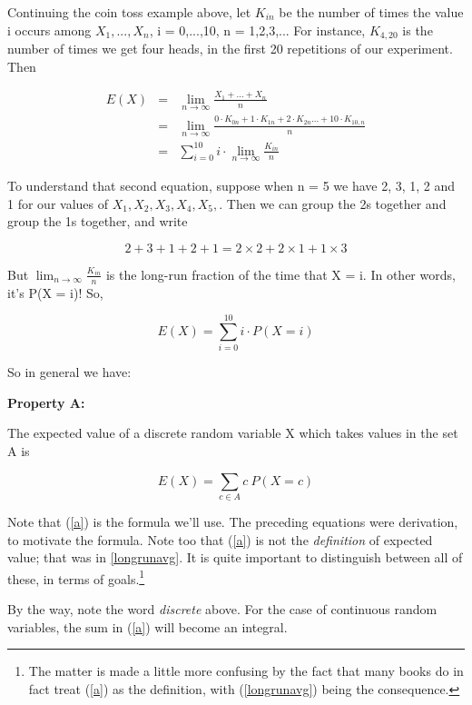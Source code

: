 Continuing the coin toss example above, let $K_{in}$ be the number of
times the value i occurs among $X_1,...,X_n$, i = 0,...,10, n =
1,2,3,...  For instance, $K_{4,20}$ is the number of times we get four
heads, in the first 20 repetitions of our experiment.  Then

\begin{eqnarray}
E(X) &=& \lim_{n \rightarrow \infty} \frac{X_1+...+X_n}{n} \\
&=& \lim_{n \rightarrow \infty} \frac{0 \cdot K_{0n}+1 \cdot K_{1n}+2 \cdot
K_{2n}...+10 \cdot K_{10,n}}{n} \\
&=& \sum_{i=0}^{10} i \cdot \lim_{n \rightarrow \infty} \frac{K_{in}}{n}
\end{eqnarray}

To understand that second equation, suppose when n = 5 we have
2, 3, 1, 2 and 1 for our values of $X_1,X_2,X_3,X_4,X_5,$.  Then we can
group the 2s together and group the 1s together, and write

\begin{equation}
2 +3 + 1 + 2 + 1 = 2 \times 2 + 2 \times 1 + 1 \times 3
\end{equation}

But $\lim_{n \rightarrow \infty} \frac{K_{in}}{n}$ is the long-run
fraction of the time that X = i.  In other words, it's P(X = i)!
So,

\begin{equation}
E(X) = \sum_{i=0}^{10} i \cdot P(X = i)
\end{equation}

So in general we have: 

{\bf Property A:} 

The expected value of a discrete random variable X which takes values in
the set A is 

\begin{equation}
\label{a}
E(X) = \sum_{c \in A} c ~ P(X = c)
\end{equation}

Note that (\ref{a}) is the formula we'll use.  The preceding equations
were derivation, to motivate the formula.  Note too that (\ref{a}) is not
the {\it definition} of expected value; that was in \ref{longrunavg}.
It is quite important to distinguish between all of these, in terms of
goals.\footnote{The matter is made a little more confusing by the fact
that many books do in fact treat (\ref{a}) as the definition, with
(\ref{longrunavg}) being the consequence.}

By the way, note the word {\it discrete} above.  For the case of
continuous random variables, the sum in (\ref{a}) will become an
integral.

